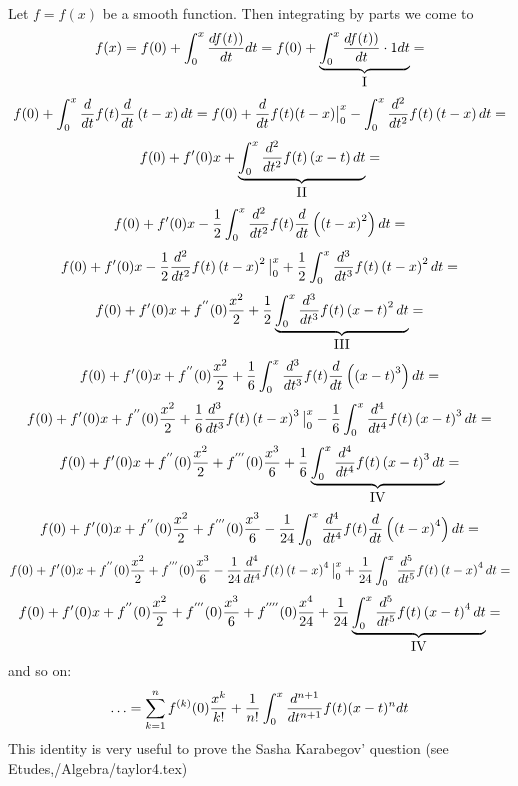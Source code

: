    Let $f=f(x)$ be a smooth function. Then
          integrating by parts we come to
                $$
f(x)=
f(0)+\int_0^x {d f(t))\over dt}dt=
f(0)+\underbrace{\int_0^x {d f(t))\over dt}\cdot 1 dt}
        _{\hbox{I}}=
         $$
          $$
f(0)+\int_0^x {d\over dt} f(t){d\over dt}\left(t-x\right)dt=
f(0)+{d\over dt} f(t)(t-x)\big\vert^x_0-
   \int_0^x {d^2\over dt^2} f(t)\left(t-x\right)dt=
            $$
           $$
f(0)+f'(0)x+
   \underbrace
            {
 \int_0^x {d^2\over dt^2} f(t)\left(x-t\right)dt
           }_{\hbox{II}}=
            $$
            $$
f(0)+f'(0)x-    {1\over2}\int_0^x {d^2\over dt^2} f(t)
    {d\over dt}\left(\left(t-x\right)^2\right)dt
           =
           $$
        $$
f(0)+f'(0)x
-   {1\over 2} {d^2\over dt^2} f(t)
    \left(t-x\right)^2\big\vert^x_0
   +
   {1\over 2}\int_0^x {d^3\over dt^3} f(t)
    \left(t-x\right)^2 dt=
          $$
            $$
f(0)+f'(0)x
+f^{''}(0) {x^2\over 2}  
   +
             {1\over 2}
      \underbrace
         {
\int_0^x {d^3\over dt^3} f(t)
    \left(x-t\right)^2 dt
        }_{\hbox{III}}=
          $$
          $$
f(0)+f'(0)x
+f^{''}(0){x^2\over 2}
+    {1\over 6 }\int_0^x {d^3\over dt^3} f(t)
    {d\over dt}\left(\left(x-t\right)^3\right)dt
           =
          $$
            $$
f(0)+f'(0)x
+f^{''}(0){x^2\over 2}
+   {1\over 6} {d^3\over dt^3} f(t)
    \left(t-x\right)^3\big\vert^x_0
   -
   {1\over 6}\int_0^x {d^4\over dt^4} f(t)
    \left(x-t\right)^3 dt=
          $$
            $$
f(0)+f'(0)x
+f^{''}(0) {x^2\over 2}  
+f^{'''}(0) {x^3\over 6}  
   +
             {1\over 6}
      \underbrace
         {
\int_0^x {d^4\over dt^4} f(t)
    \left(x-t\right)^3 dt
        }_{\hbox{IV}}=
          $$
           $$
f(0)+f'(0)x
+f^{''}(0){x^2\over 2}
+f^{'''}(0){x^3\over 6}
-    {1\over 24 }\int_0^x {d^4\over dt^4} f(t)
    {d\over dt}\left(\left(t-x\right)^4\right)dt
           =
          $$
            $$
f(0)+f'(0)x
+f^{''}(0){x^2\over 2}
+f^{'''}(0){x^3\over 6}
-   {1\over 24} {d^4\over dt^4} f(t)
    \left(t-x\right)^4\big\vert^x_0
   +
   {1\over 24}\int_0^x {d^5\over dt^5} f(t)
    \left(t-x\right)^4 dt=
          $$
            $$
f(0)+f'(0)x
+f^{''}(0) {x^2\over 2}  
+f^{'''}(0) {x^3\over 6}  
+f^{''''}(0) {x^4\over 24}  
   +
             {1\over 24}
      \underbrace
         {
\int_0^x {d^5\over dt^5} f(t)
    \left(x-t\right)^4 dt
        }_{\hbox{IV}}=
          $$
and so on:
          $$
\ldots=\sum_{k=1}^n f^{(k)}(0){x^k\over k!}+
         {1\over n!}\int_0^x 
{d^{n+1}\over dt^{n+1}}f(t)(x-t)^ndt
          $$
This identity is very useful to prove the Sasha Karabegov' 
question (see Etudes,/Algebra/taylor4.tex)


